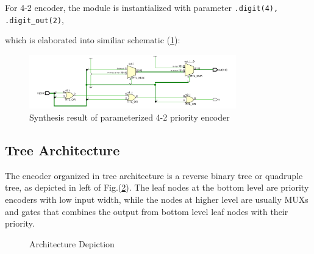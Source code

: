\documentclass[journal, onecolumn]{IEEEtran}
\begin{document}
For 4-2 encoder, the module is instantialized with parameter \lstinline{.digit(4), .digit_out(2)},



which is elaborated into similiar schematic (\ref{cascaded_42_encoder}):

\begin{figure}[htpb]
	\begin{center}
		\includegraphics[width=0.80\textwidth]{report_lab3.assets/encoder42_cas_elab_1.pdf}
		\caption{Synthesis result of parameterized 4-2 priority encoder}
		\label{cascaded_42_encoder}
	\end{center}
\end{figure}

\subsection{Tree Architecture}

The encoder organized in tree architecture is a reverse binary tree or quadruple tree, as depicted in left of Fig.(\ref{tree_depict}). The leaf nodes at the bottom level are priority encoders with low input width, while the nodes at higher level are usually MUXs and gates that combines the output from bottom level leaf nodes with their priority.

\begin{figure}[htpb]
	\begin{center}
		\hspace{0.05\columnwidth}
		\caption{Architecture Depiction}
		\label{tree_depict}
	\end{center}
\end{figure}
\end{document}
